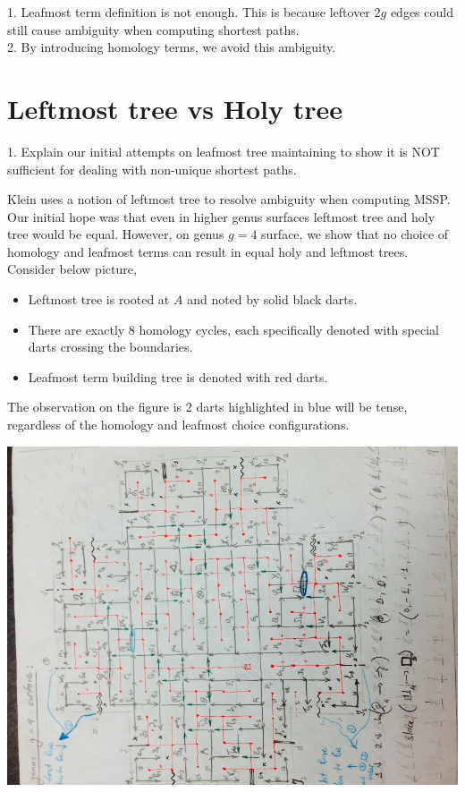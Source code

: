\documentclass{article}
\begin{document}
\begin{center}
{\color{red}
1. Leafmost term definition is not enough. This is because leftover $2g$ edges
could still cause ambiguity when computing shortest paths. \\
2. By introducing homology terms, we avoid this ambiguity.}
\end{center}

\section{Leftmost tree vs Holy tree}
\begin{center}
{\color{red}
1. Explain our initial attempts on leafmost tree maintaining to show it is NOT
sufficient for dealing with non-unique shortest paths.}
\end{center}

Klein \cite{klein2005multiple} uses a notion of leftmost tree to resolve ambiguity when 
computing MSSP.
Our initial hope was that even in higher genus surfaces leftmost tree and holy
tree would be equal. However, on genus $g = 4$ surface, we show that no
choice of homology and leafmost terms can result in equal holy and
leftmost trees. Consider below picture, \\
\begin{itemize}
\item Leftmost tree is rooted at $A$ and noted by solid black darts.
\item There are exactly 8 homology cycles, each specifically denoted with
special darts crossing the boundaries.
\item Leafmost term building tree is denoted with red darts.
\end{itemize}
The observation on the figure is 2 darts highlighted in blue will be tense, 
regardless of the homology and leafmost choice configurations.
\begin{center}
\includegraphics[angle = -90, scale = 0.7]{figures/Genus4_InitialHolyTree.jpg}
\end{center}
\end{document}
